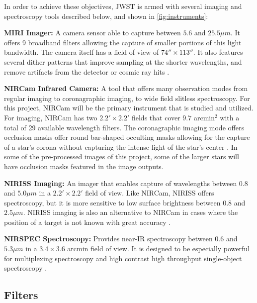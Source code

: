\documentclass[10pt,twocolumn,letterpaper]{article}
\begin{document}
In order to achieve these objectives, JWST is armed with several imaging and spectroscopy tools described below, and shown in \cref{fig:instruments}:
\newline

\textbf{MIRI Imager:} A camera sensor able to capture between $5.6$ and $25.5\mu m$. It offers 9 broadband filters allowing the capture of smaller portions of this light bandwidth. 
The camera itself has a field of view of $74'' \times 113''$. It also features several dither patterns that improve sampling at the shorter wavelengths, and remove artifacts from the detector or cosmic ray hits \cite{webbmiri}.
\newline

\textbf{NIRCam Infrared Camera:} A tool that offers many observation modes from regular imaging to coronagraphic imaging, to wide field slitless spectroscopy. For this project, NIRCam will be the primary instrument that is studied and utilized.
For imaging, NIRCam has two $2.2' \times 2.2'$ fields that cover $9.7$ arcmin$^2$ with a total of 29 available wavelength filters.
The coronagraphic imaging mode offers occlusion masks offer round bar-shaped occulting masks allowing for the capture of a star's corona without capturing the intense light of the star's center \cite{webbnircam}. In some of the pre-processed images of this project, some of the larger stars will have occlusion masks featured in the image outputs.
\newline

\textbf{NIRISS Imaging:} An imager that enables capture of wavelengths between $0.8$ and $5.0\mu m$ in a $2.2' \times 2.2'$ field of view. 
Like NIRCam, NIRISS offers spectroscopy, but it is more sensitive to low surface brightness between $0.8$ and $2.5\mu m$. 
NIRISS imaging is also an alternative to NIRCam in cases where the position of a target is not known with great accuracy \cite{webbniriss}.
\newline

\textbf{NIRSPEC Spectroscopy:} Provides near-IR spectroscopy between $0.6$ and $5.3 \mu m$ in a $3.4 \times 3.6$ arcmin field of view. It is designed to be especially powerful for multiplexing spectroscopy and high contrast high throughput single-object spectroscopy \cite{webbnirspec}.

\subsection{Filters}
\end{document}
